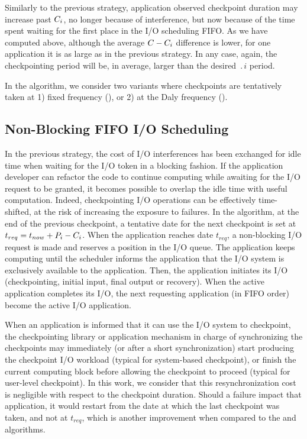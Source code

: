 Similarly to the previous strategy, application observed checkpoint
duration may increase past $C_{i}$, no longer because of interference, but now because
of  the time spent waiting for the first place in the I/O scheduling FIFO.
As we have computed above, although the average $C-C_{i}$
difference is lower, for one application it is as large as in the
previous strategy. In any case, again, the checkpointing period will
be, in average, larger than the desired $\period{i}$ period.

In the \fifoblock algorithm, we consider two variants where checkpoints are
tentatively taken at 1) fixed frequency (\bfifofixed), or 2) at the
Daly frequency (\bfifodaly).

\subsection{Non-Blocking \fifononblock FIFO I/O Scheduling}
\label{sec:fifononblock}

In the previous strategy, the cost of I/O interferences has been
exchanged for idle time when waiting for the I/O token in a blocking
fashion. If the application developer can refactor the code
to continue computing while awaiting for the I/O request to be granted,
it becomes possible to overlap the idle time with useful computation.
Indeed, checkpointing I/O operations can
be effectively time-shifted, at the risk of increasing the exposure to failures.
 In the \fifononblock algorithm, at the end of the previous checkpoint, a tentative
date for the next checkpoint is set at $t_{req}=t_{now}+P_{i}-C_{i}$.
When the application reaches date $t_{req}$, a non-blocking I/O request
is made and reserves a position in the
I/O queue. The application keeps computing until the
scheduler informs the application that the I/O system is exclusively
available to the application. Then, the application initiates its
I/O (checkpointing, initial input, final output or recovery). When the active application completes
its I/O, the next requesting application (in FIFO order)
become the active I/O application.

When an application is informed that it can use the I/O system to
checkpoint, the checkpointing library or application mechanism
in charge of synchronizing the checkpoints may immediately (or after
a short synchronization) start producing the checkpoint I/O workload
(typical for system-based checkpoint),
or finish the current computing block before allowing the checkpoint
to proceed (typical for user-level checkpoint). In this work, we consider
that this resynchronization cost is negligible with respect to the
checkpoint duration. Should a failure impact that application,
it would restart from the date at which the last checkpoint was taken, and
not at $t_{req}$, which is another improvement when compared to the
\fifoblock and \nocoop algorithms.

